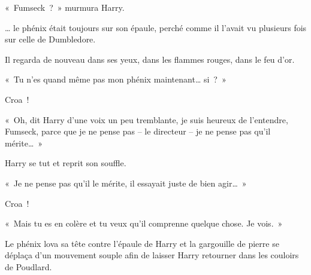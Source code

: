 «~Fumseck~?~»
murmura Harry.

… le phénix était toujours sur son épaule, perché comme il l'avait vu plusieurs fois sur celle de Dumbledore.

Il regarda de nouveau dans ses yeux, dans les flammes rouges, dans le feu d'or.

«~Tu n'es quand même pas mon phénix maintenant… si~?~»

Croa~!

«~Oh, dit Harry d'une voix un peu tremblante, je suis heureux de l'entendre, Fumseck, parce que je ne pense pas -- le directeur -- je ne pense pas qu'il mérite…~»

Harry se tut et reprit son souffle.

«~Je ne pense pas qu'il le mérite, il essayait juste de bien agir…~»

Croa~!

«~Mais tu es en colère et tu veux qu'il comprenne quelque chose.
Je vois.~»

Le phénix lova sa tête contre l'épaule de Harry et la gargouille de pierre se déplaça d'un mouvement souple afin de laisser Harry retourner dans les couloirs de Poudlard.
